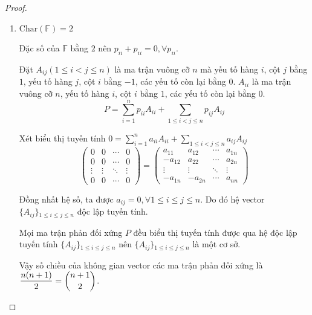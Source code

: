 \begin{proof}
\begin{enumerate}[label={\textbf{Trường hợp \arabic*.}},itemindent=2cm]
              Đồng nhất hệ số, ta được $a_{ij} = 0$. Do đó hệ vector $\{ A_{ij} \}{}_{1\le i < j \le n}$ độc lập tuyến tính.
              
              Mọi ma trận phản đối xứng $P$ biểu thị tuyến tính được qua hệ độc lập tuyến tính $\{ A_{ij} \}{}_{1\le i < j \le n}$ nên $\{ A_{ij} \}{}_{1\le i < j \le n}$ là một cơ sở.
              
              Vậy số chiều của không gian vector các ma trận phản đối xứng là $\dfrac{n(n-1)}{2} = \dbinom{n}{2}$, cơ sở là hệ các vector $\{ A_{ij} \}{}_{1\le i < j \le n}$.
        \item $\text{Char}(\mathbb{F}) = 2$
              
              Đặc số của $\mathbb{F}$ bằng $2$ nên $p_{ii} + p_{ii} = 0, \forall p_{ii}$.
              
              Đặt $A_{ij} (1\le i < j\le n)$ là ma trận vuông cỡ $n$ mà yếu tố hàng $i$, cột $j$ bằng $1$, yếu tố hàng $j$, cột $i$ bằng $-1$, các yếu tố còn lại bằng $0$. $A_{ii}$ là ma trận vuông cỡ $n$, yếu tố hàng $i$, cột $i$ bằng $1$, các yếu tố còn lại bằng $0$.
              \[ P = \sum^{n}_{i=1}p_{ii}A_{ii} + \sum_{1\le i < j \le n}p_{ij}A_{ij} \]
              
              Xét biểu thị tuyến tính $0 = \sum^{n}_{i=1}a_{ii}A_{ii} + \sum_{1\le i < j \le n}a_{ij}A_{ij}$
              \[
                  \begin{pmatrix}
                      0      & 0      & \cdots & 0      \\
                      0      & 0      & \cdots & 0      \\
                      \vdots & \vdots & \ddots & \vdots \\
                      0      & 0      & \cdots & 0
                  \end{pmatrix} =
                  \begin{pmatrix}
                      a_{11}  & a_{12}  & \cdots & a_{1n} \\
                      -a_{12} & a_{22}  & \cdots & a_{2n} \\
                      \vdots  & \vdots  & \ddots & \vdots \\
                      -a_{1n} & -a_{2n} & \cdots & a_{nn}
                  \end{pmatrix}
              \]
              
              Đồng nhất hệ số, ta được $a_{ij} = 0, \forall 1\le i\le j\le n$. Do đó hệ vector $\{ A_{ij} \}{}_{1\le i \le j \le n}$ độc lập tuyến tính.
              
              Mọi ma trận phản đối xứng $P$ đều biểu thị tuyến tính được qua hệ độc lập tuyến tính $\{ A_{ij} \}{}_{1\le i \le j \le n}$ nên $\{ A_{ij} \}{}_{1\le i \le j\le n}$ là một cơ sở.
              
              Vậy số chiều của không gian vector các ma trận phản đối xứng là $\dfrac{n(n + 1)}{2} = \dbinom{n+1}{2}$.
    \end{enumerate}
\end{proof}

